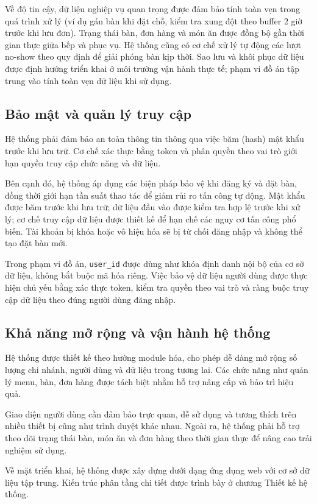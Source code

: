 ﻿\documentclass[../DoAn.tex]{subfiles}
\begin{document}
Về độ tin cậy, dữ liệu nghiệp vụ quan trọng được đảm bảo tính toàn vẹn trong quá trình xử lý (ví dụ gán bàn khi đặt chỗ, kiểm tra xung đột theo buffer 2 giờ trước khi lưu đơn). Trạng thái bàn, đơn hàng và món ăn được đồng bộ gần thời gian thực giữa bếp và phục vụ. Hệ thống cũng có cơ chế xử lý tự động các lượt no-show theo quy định để giải phóng bàn kịp thời. Sao lưu và khôi phục dữ liệu được định hướng triển khai ở môi trường vận hành thực tế; phạm vi đồ án tập trung vào tính toàn vẹn dữ liệu khi sử dụng.

\subsection{Bảo mật và quản lý truy cập}
Hệ thống phải đảm bảo an toàn thông tin thông qua việc băm (hash) mật khẩu trước khi lưu trữ. Cơ chế xác thực bằng token và phân quyền theo vai trò giới hạn quyền truy cập chức năng và dữ liệu.

Bên cạnh đó, hệ thống áp dụng các biện pháp bảo vệ khi đăng ký và đặt bàn, đồng thời giới hạn tần suất thao tác để giảm rủi ro tấn công tự động. Mật khẩu được băm trước khi lưu trữ; dữ liệu đầu vào được kiểm tra hợp lệ trước khi xử lý; cơ chế truy cập dữ liệu được thiết kế để hạn chế các nguy cơ tấn công phổ biến. Tài khoản bị khóa hoặc vô hiệu hóa sẽ bị từ chối đăng nhập và không thể tạo đặt bàn mới.

Trong phạm vi đồ án, \texttt{user\_id} được dùng như khóa định danh nội bộ của cơ sở dữ liệu, không bắt buộc mã hóa riêng. Việc bảo vệ dữ liệu người dùng được thực hiện chủ yếu bằng xác thực token, kiểm tra quyền theo vai trò và ràng buộc truy cập dữ liệu theo đúng người dùng đăng nhập.

\subsection{Khả năng mở rộng và vận hành hệ thống}
Hệ thống được thiết kế theo hướng module hóa, cho phép dễ dàng mở rộng số lượng chi nhánh, người dùng và dữ liệu trong tương lai. Các chức năng như quản lý menu, bàn, đơn hàng được tách biệt nhằm hỗ trợ nâng cấp và bảo trì hiệu quả.

Giao diện người dùng cần đảm bảo trực quan, dễ sử dụng và tương thích trên nhiều thiết bị cũng như trình duyệt khác nhau. Ngoài ra, hệ thống phải hỗ trợ theo dõi trạng thái bàn, món ăn và đơn hàng theo thời gian thực để nâng cao trải nghiệm sử dụng.

Về mặt triển khai, hệ thống được xây dựng dưới dạng ứng dụng web với cơ sở dữ liệu tập trung. Kiến trúc phân tầng chi tiết được trình bày ở chương Thiết kế hệ thống.
\end{document}
